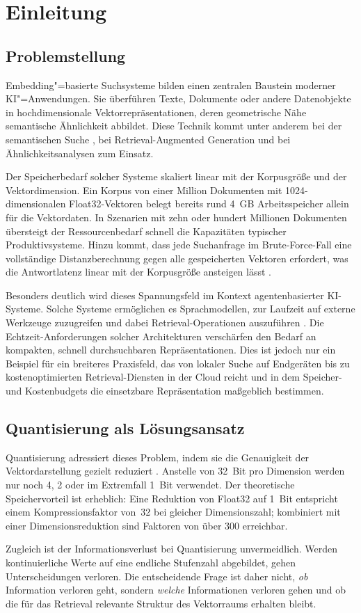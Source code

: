 \chapter{Einleitung}
%
\section{Problemstellung}
%
Embedding"=basierte Suchsysteme bilden einen zentralen Baustein moderner KI"=Anwendungen.
Sie überführen Texte, Dokumente oder andere Datenobjekte in hochdimensionale Vektorrepräsentationen, deren geometrische Nähe semantische Ähnlichkeit abbildet.
Diese Technik kommt unter anderem bei der semantischen Suche \cite{reimers_2019_sbert,karpukhin_2020_dpr}, bei Retrieval-Augmented Generation \cite{lewis_2020_rag} und bei Ähnlichkeitsanalysen zum Einsatz.
\par
Der Speicherbedarf solcher Systeme skaliert linear mit der Korpusgröße und der Vektordimension.
Ein Korpus von einer Million Dokumenten mit 1024-dimensionalen Float32-Vektoren belegt bereits rund 4~GB Arbeitsspeicher allein für die Vektordaten.
In Szenarien mit zehn oder hundert Millionen Dokumenten übersteigt der Ressourcenbedarf schnell die Kapazitäten typischer Produktivsysteme.
Hinzu kommt, dass jede Suchanfrage im Brute-Force-Fall eine vollständige Distanzberechnung gegen alle gespeicherten Vektoren erfordert, was die Antwortlatenz linear mit der Korpusgröße ansteigen lässt \cite{johnson_2021_faiss}.
\par
Besonders deutlich wird dieses Spannungsfeld im Kontext agentenbasierter KI-Systeme.
Solche Systeme ermöglichen es Sprachmodellen, zur Laufzeit auf externe Werkzeuge zuzugreifen und dabei Retrieval-Operationen auszuführen \cite{schick_2023_toolformer,yao_2023_react}.
Die Echtzeit-Anforderungen solcher Architekturen verschärfen den Bedarf an kompakten, schnell durchsuchbaren Repräsentationen.
Dies ist jedoch nur ein Beispiel für ein breiteres Praxisfeld, das von lokaler Suche auf Endgeräten bis zu kostenoptimierten Retrieval-Diensten in der Cloud reicht und in dem Speicher- und Kostenbudgets die einsetzbare Repräsentation maßgeblich bestimmen.
%
\section{Quantisierung als Lösungsansatz}
%
Quantisierung adressiert dieses Problem, indem sie die Genauigkeit der Vektordarstellung gezielt reduziert \cite{gray_1998_quantization}.
Anstelle von 32~Bit pro Dimension werden nur noch 4, 2 oder im Extremfall 1~Bit verwendet.
Der theoretische Speichervorteil ist erheblich: Eine Reduktion von Float32 auf 1~Bit entspricht einem Kompressionsfaktor von~32 bei gleicher Dimensionszahl; kombiniert mit einer Dimensionsreduktion sind Faktoren von über 300 erreichbar.
\par
Zugleich ist der Informationsverlust bei Quantisierung unvermeidlich.
Werden kontinuierliche Werte auf eine endliche Stufenzahl abgebildet, gehen Unterscheidungen verloren.
Die entscheidende Frage ist daher nicht, \emph{ob} Information verloren geht, sondern \emph{welche} Informationen verloren gehen und ob die für das Retrieval relevante Struktur des Vektorraums erhalten bleibt.
%

